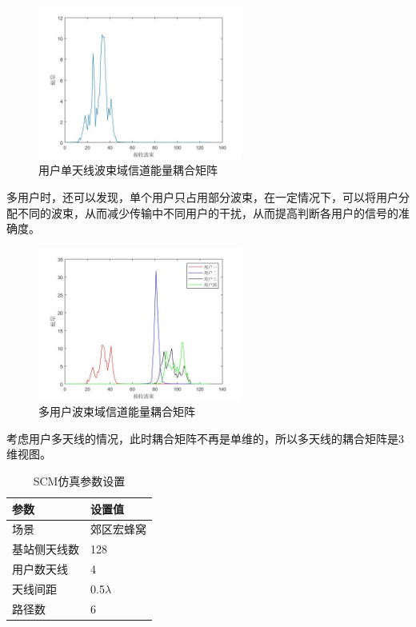 \documentclass[bachelor,nocolorlinks, printoneside]{seuthesis} %
\begin{document}
\begin{Main}
\begin{figure}[htbp!]
	\centering \includegraphics[width=0.6\textwidth]{img/2_2.jpg} \caption{用户单天线波束域信道能量耦合矩阵}
\end{figure}
多用户时，还可以发现，单个用户只占用部分波束，在一定情况下，可以将用户分配不同的波束，从而减少传输中不同用户的干扰，从而提高判断各用户的信号的准确度。
\begin{figure}[htbp!]
	\centering \includegraphics[width=0.6\textwidth]{img/2_5.jpg} \caption{多用户波束域信道能量耦合矩阵}
\end{figure}
考虑用户多天线的情况，此时耦合矩阵不再是单维的，所以多天线的耦合矩阵是3维视图。
\begin{table}[htbp]
	\centering
	\caption{\label{tab:test}SCM仿真参数设置}
	\begin{tabular}{ll}
		\toprule
		参数 &  设置值 \\
		\bottomrule
		场景 &  郊区宏蜂窝 \\
		\bottomrule
		基站侧天线数 & 128 \\
		\bottomrule
		用户数天线	& 4 \\
		\bottomrule
		天线间距 & 0.5$\lambda$ \\
		\bottomrule
		路径数 & 6 \\
		\bottomrule
	\end{tabular}
\end{table}


\end{Main}
\end{document}
